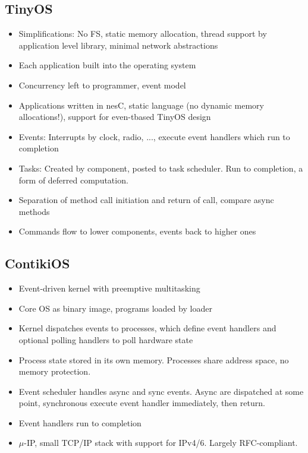 \subsection{TinyOS}

\begin{itemize}
		\item Simplifications: No FS, static memory allocation, thread support by application level library, minimal network abstractions
		\item Each application built into the operating system
		\item Concurrency left to programmer, event model
		\item Applications written in nesC, static language (no dynamic memory allocations!), support for even-tbased TinyOS design
		\item Events: Interrupts by clock, radio, ..., execute event handlers which run to completion
		\item Tasks: Created by component, posted to task scheduler. Run to completion, a form of deferred computation.
		\item Separation of method call initiation and return of call, compare async methods
		\item Commands flow to lower components, events back to higher ones
\end{itemize}

\subsection{ContikiOS}

\begin{itemize}
		\item Event-driven kernel with preemptive multitasking
		\item Core OS as binary image, programs loaded by loader
		\item Kernel dispatches events to processes, which define event handlers and optional polling handlers to poll hardware state
		\item Process state stored in its own memory. Processes share address space, no memory protection.
		\item Event scheduler handles async and sync events. Async are
				dispatched at some point, synchronous execute event handler
				immediately, then return.
		\item Event handlers run to completion
		\item $\mu$-IP, small TCP/IP stack with support for IPv4/6. Largely RFC-compliant.
\end{itemize}

